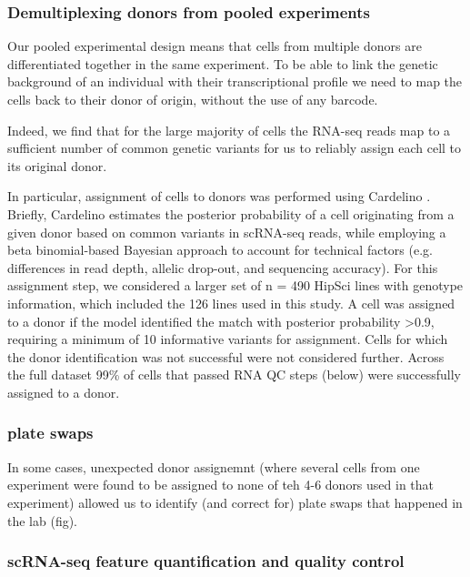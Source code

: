 \subsubsection{Demultiplexing donors from pooled experiments} 

Our pooled experimental design means that cells from multiple donors are differentiated together in the same experiment. 
To be able to link the genetic background of an individual with their transcriptional profile we need to map the cells back to their donor of origin, without the use of any barcode.

Indeed, we find that for the large majority of cells the RNA-seq reads map to a sufficient number of common genetic variants for us to reliably assign each cell to its original donor.

In particular, assignment of cells to donors was performed using Cardelino \cite{mccarthy2020cardelino}. 
Briefly, Cardelino estimates the posterior probability of a cell originating from a given donor based on common variants in scRNA-seq reads, while employing a beta binomial-based Bayesian approach to account for technical factors (e.g. differences in read depth, allelic drop-out, and sequencing accuracy). 
For this assignment step, we considered a larger set of n = 490 HipSci lines with genotype information, which included the 126 lines used in this study. 
A cell was assigned to a donor if the model identified the match with posterior probability >0.9, requiring a minimum of 10 informative variants for assignment. 
Cells for which the donor identification was not successful were not considered further.
Across the full dataset 99\% of cells that passed RNA QC steps (below) were successfully assigned to a donor.

\subsubsection{plate swaps}

In some cases, unexpected donor assignemnt (where several cells from one experiment were found to be assigned to none of teh 4-6 donors used in that experiment) allowed us to identify (and correct for) plate swaps that happened in the lab (fig).

\subsubsection{scRNA-seq feature quantification and quality control}

